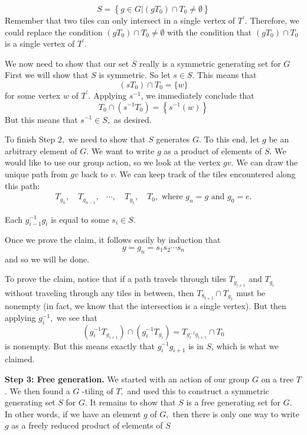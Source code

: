 \[
S=\left\{g \in G |\left(g T_{0}\right) \cap T_{0} \neq \emptyset\right\}
\]
Remember that two tiles can only intersect in a single vertex of $T^{\prime} .$ Therefore, we could replace the condition $\left(g T_{0}\right) \cap T_{0} \neq \emptyset$ with the condition that $\left(g T_{0}\right) \cap T_{0}$ is a single vertex of $T^{\prime}$.
\par
We now need to show that our set $S$ really is a symmetric generating set for $G$ First we will show that $S$ is symmetric. So let $s \in S .$ This means that
\[
\left(s T_{0}\right) \cap T_{0}=\{w\}
\]
for some vertex $w$ of $T^{\prime}$. Applying $s^{-1}$, we immediately conclude that
\[
T_{0} \cap\left(s^{-1} T_{0}\right)=\left\{s^{-1}(w)\right\}
\]
But this means that $s^{-1} \in S,$ as desired.
\par
To finish Step $2,$ we need to show that $S$ generates $G .$ To this end, let $g$ be an arbitrary element of $G .$ We want to write $g$ as a product of elements of $S .$ We would like to use our group action, so we look at the vertex $g v .$ We can draw the unique path from $g v$ back to $v$. We can keep track of the tiles encountered along this path:
\[
\begin{aligned}
T_{g_{n}}, \quad T_{g_{n-1}}, & \cdots, \quad T_{g_{1}}, \quad T_{0}, 
\text { where } g_{n}=g \text { and } g_{0}=e.
\end{aligned}
\]
\begin{claim}
Each $g_{i-1}^{-1} g_{i}$ is equal to some $s_{i} \in S$.
\end{claim}
Once we prove the claim, it follows easily by induction that
\[
g=g_{n}=s_{1} s_{2} \cdots s_{n}
\]
and so we will be done. 
\par
To prove the claim, notice that if a path travels through tiles $T_{g_{i+1}}$ and $T_{g_{i}}$ without traveling through any tiles in between, then $T_{8_{t+1}} \cap T_{g_{1}}$ must be nonempty (in fact, we know that the intersection is a single vertex). But then applying $g_{i}^{-1},$ we see that
\[
\left(g_{i}^{-1} T_{g_{i+1}}\right) \cap\left(g_{i}^{-1} T_{g_{i}}\right)=T_{g_{i}^{-1}g_{i+1}} \cap T_{0}
\]
is nonempty. But this means exactly that $g_{i}^{-1} g_{i+1}$ is in $S$, which is what we claimed.
\par
\textbf{Step 3: Free generation.} We started with an action of our group $G$ on a tree $T$. We then found a $G$ -tiling of $T,$ and used this to construct a symmetric generating set $S$ for $G .$ It remains to show that $S$ is a free generating set for $G .$ In other words, if we have an element $g$ of $G,$ then there is only one way to write $g$ as a freely reduced product of elements of $S$

